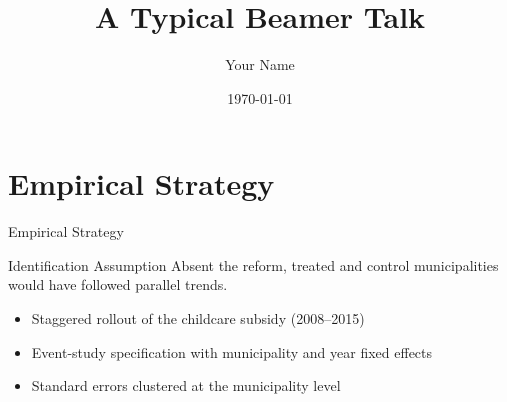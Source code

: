 \documentclass[aspectratio=169]{beamer}
\title{A Typical Beamer Talk}
\author{Your Name}
\institute{Your University}
\date{\today}
\begin{document}
\section{Empirical Strategy}

\begin{frame}{Empirical Strategy}
  \begin{block}{Identification Assumption}
    Absent the reform, treated and control municipalities would have followed parallel trends.
  \end{block}
  \begin{itemize}
    \item Staggered rollout of the childcare subsidy (2008--2015)
    \item Event-study specification with municipality and year fixed effects
    \item Standard errors clustered at the municipality level
  \end{itemize}
\end{frame}
\end{document}
